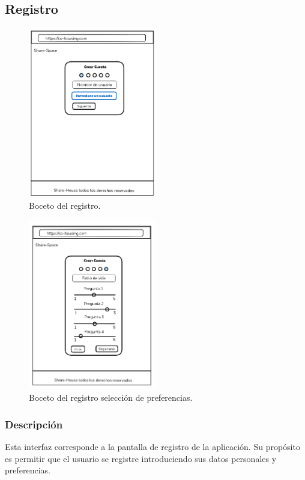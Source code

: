\subsection{Registro}
\begin{figure}[H]
    \centering
    \includegraphics[width=0.5\textwidth]{fotos/registro-boceto.png}
    \caption{Boceto del registro.}
    \label{fig:registro}
\end{figure}
\begin{figure}[H]
    \centering
    \includegraphics[width=0.5\textwidth]{fotos/registro2-boceto.png}
    \caption{Boceto del registro selección de preferencias.}
    \label{fig:registro2}
\end{figure}
\subsubsection{Descripción}
Esta interfaz corresponde a la pantalla de registro de la aplicación. Su propósito es permitir que el usuario se registre introduciendo sus datos personales y preferencias.

